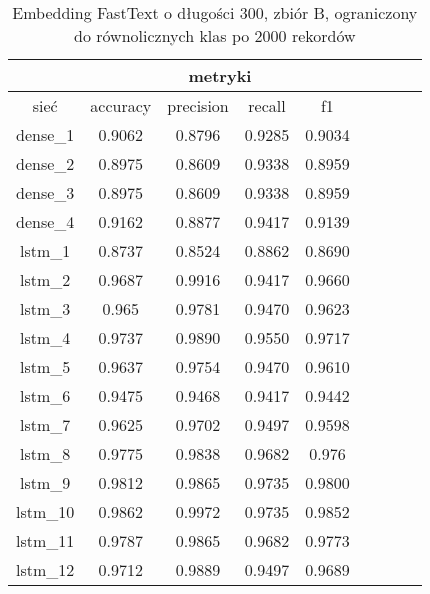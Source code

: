 \begin{table}[p] \label{tab:wyniki_fastext_B_lim} \centering
    \caption{Embedding FastText o długości 300, zbiór B, ograniczony do równolicznych klas po 2000 rekordów}
    \begin{tabular} {|c|c|c|c|c|c|c|c|c| }    \hline
                 & \multicolumn{4}{c|}{metryki}                               \\ \hline
        sieć     & accuracy                     & precision & recall & f1     \\ \hline
        dense\_1 & 0.9062                       & 0.8796    & 0.9285 & 0.9034 \\ \hline
        dense\_2 & 0.8975                       & 0.8609    & 0.9338 & 0.8959 \\ \hline
        dense\_3 & 0.8975                       & 0.8609    & 0.9338 & 0.8959 \\ \hline
        dense\_4 & 0.9162                       & 0.8877    & 0.9417 & 0.9139 \\ \hline
        lstm\_1  & 0.8737                       & 0.8524    & 0.8862 & 0.8690 \\ \hline
        lstm\_2  & 0.9687                       & 0.9916    & 0.9417 & 0.9660 \\ \hline
        lstm\_3  & 0.965                        & 0.9781    & 0.9470 & 0.9623 \\ \hline
        lstm\_4  & 0.9737                       & 0.9890    & 0.9550 & 0.9717 \\ \hline
        lstm\_5  & 0.9637                       & 0.9754    & 0.9470 & 0.9610 \\ \hline
        lstm\_6  & 0.9475                       & 0.9468    & 0.9417 & 0.9442 \\ \hline
        lstm\_7  & 0.9625                       & 0.9702    & 0.9497 & 0.9598 \\ \hline
        lstm\_8  & 0.9775                       & 0.9838    & 0.9682 & 0.976  \\ \hline
        lstm\_9  & 0.9812                       & 0.9865    & 0.9735 & 0.9800 \\ \hline
        lstm\_10 & 0.9862                       & 0.9972    & 0.9735 & 0.9852 \\ \hline
        lstm\_11 & 0.9787                       & 0.9865    & 0.9682 & 0.9773 \\ \hline
        lstm\_12 & 0.9712                       & 0.9889    & 0.9497 & 0.9689 \\ \hline

\end{tabular}
\end{table}
